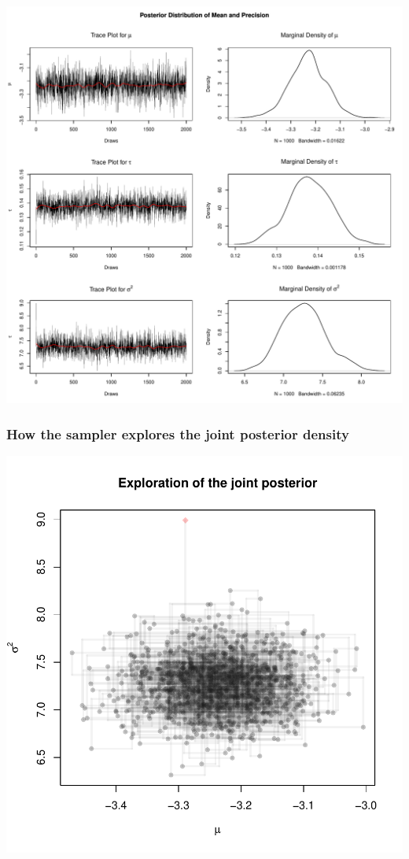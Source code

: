\documentclass[
  11pt,
]{article}
\begin{document}
\begin{center}\includegraphics{03-lec_files/figure-latex/posterior-sim-1} \end{center}

\hypertarget{how-the-sampler-explores-the-joint-posterior-density}{%
\subsubsection{How the sampler explores the joint posterior density}\label{how-the-sampler-explores-the-joint-posterior-density}}

\begin{center}\includegraphics{03-lec_files/figure-latex/joint-posterior-1} \end{center}
\end{document}
